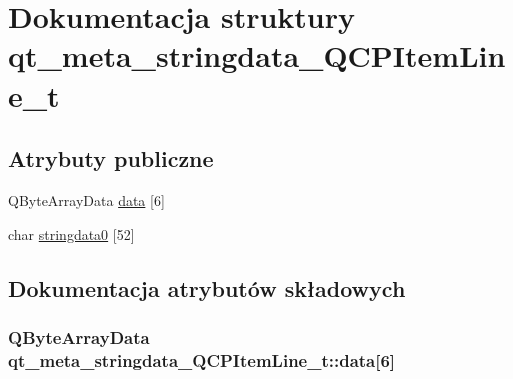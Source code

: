 \hypertarget{structqt__meta__stringdata___q_c_p_item_line__t}{}\section{Dokumentacja struktury qt\+\_\+meta\+\_\+stringdata\+\_\+\+Q\+C\+P\+Item\+Line\+\_\+t}
\label{structqt__meta__stringdata___q_c_p_item_line__t}
\subsection*{Atrybuty publiczne}
\begin{DoxyCompactItemize}
\item 
Q\+Byte\+Array\+Data \hyperlink{structqt__meta__stringdata___q_c_p_item_line__t_a4caaf475c8c9a2899091e373fb1c6d49}{data} \mbox{[}6\mbox{]}
\item 
char \hyperlink{structqt__meta__stringdata___q_c_p_item_line__t_a35c5e2ac8b06d8035260983dc8b9dafa}{stringdata0} \mbox{[}52\mbox{]}
\end{DoxyCompactItemize}


\subsection{Dokumentacja atrybutów składowych}
\subsubsection[{\texorpdfstring{data}{data}}]{\setlength{\rightskip}{0pt plus 5cm}Q\+Byte\+Array\+Data qt\+\_\+meta\+\_\+stringdata\+\_\+\+Q\+C\+P\+Item\+Line\+\_\+t\+::data\mbox{[}6\mbox{]}}\hypertarget{structqt__meta__stringdata___q_c_p_item_line__t_a4caaf475c8c9a2899091e373fb1c6d49}{}\label{structqt__meta__stringdata___q_c_p_item_line__t_a4caaf475c8c9a2899091e373fb1c6d49}
